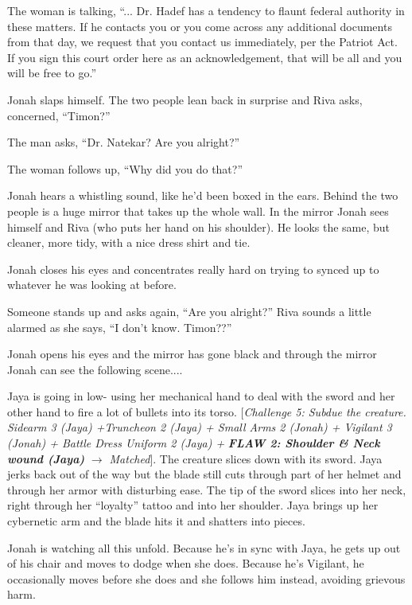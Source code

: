 The woman is talking, ``... Dr. Hadef has a tendency to flaunt federal authority in these matters.  If he contacts you or you come across any additional documents from that day, we request that you contact us immediately, per the Patriot Act.  If you sign this court order here as an acknowledgement, that will be all and you will be free to go.''

Jonah slaps himself.  The two people lean back in surprise and Riva asks, concerned, ``Timon?''

The man asks, ``Dr. Natekar?  Are you alright?''

The woman follows up, ``Why did you do that?''

Jonah hears a whistling sound, like he'd been boxed in the ears.  Behind the two people is a huge mirror that takes up the whole wall.  In the mirror Jonah sees himself and Riva (who puts her hand on his shoulder). He looks the same, but cleaner, more tidy, with a nice dress shirt and tie.

Jonah closes his eyes and concentrates really hard on trying to synced up to whatever he was looking at before.

Someone stands up and asks again, ``Are you alright?''  Riva sounds a little alarmed as she says, ``I don't know.  Timon??''

Jonah opens his eyes and the mirror has gone black and through the mirror Jonah can see the following scene....



Jaya is going in low- using her mechanical hand to deal with the sword and her other hand to fire a lot of bullets into its torso.  {[}\textit{Challenge 5: Subdue the creature.  Sidearm 3 (Jaya) +Truncheon 2 (Jaya) + Small Arms 2 (Jonah) + Vigilant 3 (Jonah) + Battle Dress Uniform 2 (Jaya) + }\textit{\textbf{ {\color[RGB]{255,0,0}FLAW 2: Shoulder \& Neck wound (Jaya)} }}\textit{ $\rightarrow$ Matched}{]}.  The creature slices down with its sword.  Jaya jerks back out of the way but the blade still cuts through part of her helmet and through her armor with disturbing ease.  The tip of the sword slices into her neck, right through her ``loyalty'' tattoo and into her shoulder.  Jaya brings up her cybernetic arm and the blade hits it and shatters into pieces.  



Jonah is watching all this unfold.  Because he's in sync with Jaya, he gets up out of his chair and moves to dodge when she does.  Because he's Vigilant, he occasionally moves before she does and she follows him instead, avoiding grievous harm.

